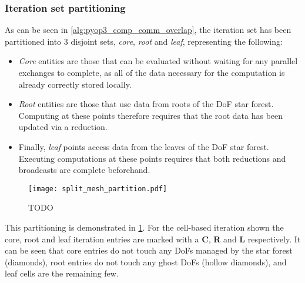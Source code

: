 \documentclass[thesis]{subfiles}
\begin{document}
\subsubsection{Iteration set partitioning}

As can be seen in \cref{alg:pyop3_comp_comm_overlap}, the iteration set has been partitioned into 3 disjoint sets, \textit{core}, \textit{root} and \textit{leaf}, representing the following:

\begin{itemize}
  \item
    \textit{Core} entities are those that can be evaluated without waiting for any parallel exchanges to complete, as all of the data necessary for the computation is already correctly stored locally.

  \item
    \textit{Root} entities are those that use data from roots of the DoF star forest.
    Computing at these points therefore requires that the root data has been updated via a reduction.

  \item
    Finally, \textit{leaf} points access data from the leaves of the DoF star forest.
    Executing computations at these points requires that both reductions and broadcasts are complete beforehand.
\end{itemize}

\begin{figure}
  \centering
  \texttt{[image: split\_mesh\_partition.pdf]}
  \caption{TODO}
  \label{fig:split_mesh_partition}
\end{figure}

This partitioning is demonstrated in \cref{fig:split_mesh_partition}.
For the cell-based iteration shown the core, root and leaf iteration entries are marked with a \textbf{C}, \textbf{R} and \textbf{L} respectively.
It can be seen that core entries do not touch any DoFs managed by the star forest (diamonds), root entries do not touch any ghost DoFs (hollow diamonds), and leaf cells are the remaining few.
\end{document}
